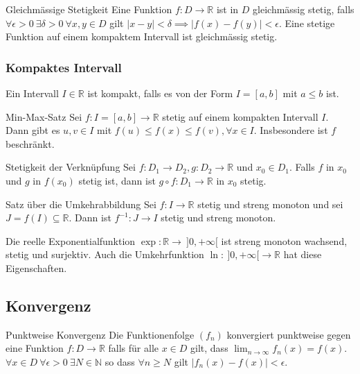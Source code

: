 \documentclass[a4paper,10pt]{article}
\def\limn{\lim_{n\to \infty}}
\def\R{\mathbb{R}}
\begin{document}
\begin{subbox}{Gleichmässige Stetigkeit}
  Eine Funktion $f: D \to \mathbb{R}$ ist in $D$ gleichmässig stetig, falls $\forall \epsilon > 0 \ \exists \delta > 0 \ \forall x, y \in D$ gilt $|x - y| < \delta \implies |f(x) - f(y)| < \epsilon$. Eine stetige Funktion auf einem kompaktem Intervall ist gleichmässig stetig.
\end{subbox}

\subsubsection{Kompaktes Intervall}
Ein Intervall $I \in \R$ ist kompakt, falls es von der Form $I = [a,b]$ mit $a \le b$ ist.

\begin{mainbox}{Min-Max-Satz}
 Sei $f: I = [a,b] \to \R$ stetig auf einem kompakten Intervall $I$. Dann gibt es $u, v \in I$ mit $f(u) \le f(x) \le f(v), \forall x \in I$. Insbesondere ist $f$ beschränkt.
\end{mainbox}

\begin{subbox}{Stetigkeit der Verknüpfung}
 Sei $f: D_1 \to D_2, g: D_2 \to \R$ und $x_0 \in D_1$. Falls $f$ in $x_0$ und $g$ in $f(x_0)$ stetig ist, dann ist $g \circ f: D_1 \to \R$ in $x_0$ stetig.
\end{subbox}

\begin{mainbox}{Satz über die Umkehrabbildung}
 Sei $f: I \to \R$ stetig und streng monoton und sei $J = f(I) \subseteq \R$. Dann ist $f^{-1}: J \to I$ stetig und streng monoton.
\end{mainbox}

\begin{subbox}{Die reelle Exponentialfunktion}
 $\exp: \R \to \ ]0,+\infty[$ ist streng monoton wachsend, stetig und surjektiv. Auch die Umkehrfunktion $\ln: \ ]0,+\infty[ \to \R$ hat diese Eigenschaften.
\end{subbox}

\subsection{Konvergenz}

\begin{mainbox}{Punktweise Konvergenz}
  Die Funktionenfolge $(f_n)$ konvergiert punktweise gegen eine Funktion $f: D \to \R$ falls für alle $x \in D$ gilt, dass $\limn f_n(x) = f(x)$.\\
  $\forall x \in D \ \forall \epsilon > 0 \ \exists N \in \mathbb{N}$ so dass $\forall n \geq N$ gilt $|f_n(x) - f(x)| < \epsilon$.
\end{mainbox}
\end{document}

